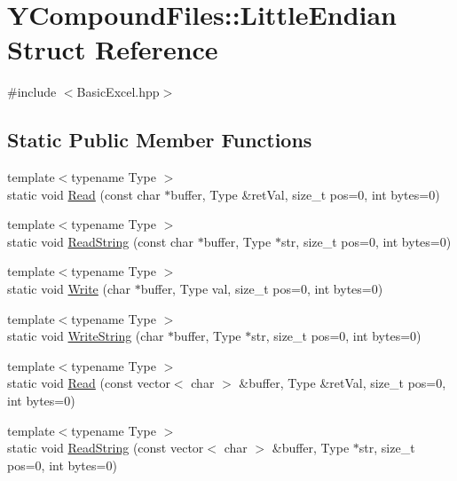 \hypertarget{struct_y_compound_files_1_1_little_endian}{}\section{Y\+Compound\+Files\+:\+:Little\+Endian Struct Reference}
\label{struct_y_compound_files_1_1_little_endian}


{\ttfamily \#include $<$Basic\+Excel.\+hpp$>$}

\subsection*{Static Public Member Functions}
\begin{DoxyCompactItemize}
\item 
{\footnotesize template$<$typename Type $>$ }\\static void \hyperlink{struct_y_compound_files_1_1_little_endian_aa1abbafbc2ae88773a9de5fdedc2951d}{Read} (const char $\ast$buffer, Type \&ret\+Val, size\+\_\+t pos=0, int bytes=0)
\item 
{\footnotesize template$<$typename Type $>$ }\\static void \hyperlink{struct_y_compound_files_1_1_little_endian_a70f369d37063b9992e94775a44b1c6ec}{Read\+String} (const char $\ast$buffer, Type $\ast$str, size\+\_\+t pos=0, int bytes=0)
\item 
{\footnotesize template$<$typename Type $>$ }\\static void \hyperlink{struct_y_compound_files_1_1_little_endian_a26c8ed75679d9e99a3f35115d9eceba2}{Write} (char $\ast$buffer, Type val, size\+\_\+t pos=0, int bytes=0)
\item 
{\footnotesize template$<$typename Type $>$ }\\static void \hyperlink{struct_y_compound_files_1_1_little_endian_a8fe264d85ae6bf400759c42e41aba0e9}{Write\+String} (char $\ast$buffer, Type $\ast$str, size\+\_\+t pos=0, int bytes=0)
\item 
{\footnotesize template$<$typename Type $>$ }\\static void \hyperlink{struct_y_compound_files_1_1_little_endian_a5ff3ff2d62117353c9f387d5d79c209e}{Read} (const vector$<$ char $>$ \&buffer, Type \&ret\+Val, size\+\_\+t pos=0, int bytes=0)
\item 
{\footnotesize template$<$typename Type $>$ }\\static void \hyperlink{struct_y_compound_files_1_1_little_endian_a346a196e2b55c4fa56272db27aba1c0c}{Read\+String} (const vector$<$ char $>$ \&buffer, Type $\ast$str, size\+\_\+t pos=0, int bytes=0)

\end{DoxyCompactItemize}
